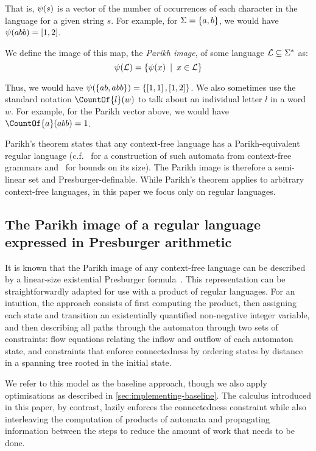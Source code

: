 That is, $\operatorname{\psi}(s)$ is a vector of the number of occurrences of each
character in the language for a given string $s$. For example, for  $\Sigma =
\left\{a, b\right\}$, we would have $\operatorname{\psi}(abb) = \left[{1, 2}\right]$.

We define the image of this map, the \textit{Parikh image}, of some
language $\operatorname{\mathcal{L}} \subseteq \Sigma^*$ as:
\[
\operatorname{\psi}(\operatorname{\mathcal{L}}) = \left\{\operatorname{\psi}(x) \:\mid\: x \in \operatorname{\mathcal{L}}\right\}
\]

Thus, we would have $\operatorname{\psi}(\left\{ab, abb\right\}) = \left\{\left[1,
1\right], \left[1, 2\right]\right\}$. We also sometimes use the standard
notation $\CountOf{l}(w)$ to talk about an individual letter $l$ in a word $w$. For
example, for the Parikh vector above, we would have $\CountOf{a}(abb) = 1$.

Parikh's theorem states that any context-free language has a Parikh-equivalent
regular language (c.f.~\cite{construction} for a construction of such automata
from context-free grammars and~\cite{bounds} for bounds on its size).
The Parikh image is therefore a semi-linear set and Presburger-definable.
%
While Parikh's theorem applies to arbitrary context-free languages, in this
paper we focus only on regular languages.

\subsection{The Parikh image of a regular language expressed in Presburger arithmetic}
\label{sec:verma}

It is known that the Parikh image of any context-free language can be
described by a linear-size existential Presburger
formula~\cite{generate-parikh-image}. This representation can be
straightforwardly adapted for use with a product of regular
languages. For an intuition, the approach consists of first computing
the product, then assigning each state and transition an existentially
quantified non-negative integer variable, and then describing all
paths through the automaton through two sets of constraints: flow
equations relating the inflow and outflow of each automaton state, and
constraints that enforce connectedness by ordering states by distance
in a spanning tree rooted in the initial state.

We refer to this model as the baseline approach, though we also apply
optimisations as described in \cref{sec:implementing-baseline}. The calculus
introduced in this paper, by contrast, lazily enforces the connectedness
constraint while also interleaving the computation of products of automata and
propagating information between the steps to reduce the amount of work that
needs to be done.


